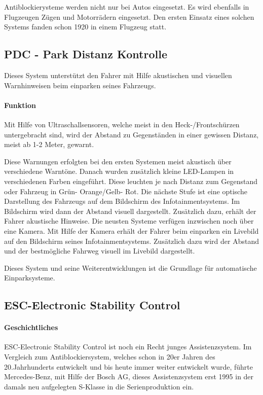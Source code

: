 Antiblockierysteme werden nicht nur bei Autos eingesetzt. Es wird ebenfalls in Flugzeugen Zügen und Motorrädern eingesetzt. 
Den ersten Einsatz eines solchen Systems fanden schon 1920 in einem Flugzeug statt.

\subsection{PDC - Park Distanz Kontrolle}
Dieses System unterstützt den Fahrer mit Hilfe akustischen und visuellen Warnhinweisen beim einparken seines Fahrzeugs. 
\paragraph{Funktion}Mit Hilfe von Ultraschallsensoren, welche meist in den Heck-/Frontschürzen untergebracht sind, wird der Abstand zu Gegenständen in einer gewissen Distanz, meist ab 1-2 Meter, gewarnt. 

Diese Warnungen erfolgten bei den ersten Systemen meist akustisch über verschiedene Warntöne. Danach wurden zusätzlich kleine LED-Lampen in verschiedenen Farben eingeführt. Diese leuchten je nach Distanz zum Gegenstand oder Fahrzeug in Grün- Orange/Gelb- Rot. Die nächste Stufe ist eine optische Darstellung des Fahrzeugs auf dem Bildschirm des Infotainmentsystems. Im Bildschirm wird dann der Abstand visuell dargestellt. Zusätzlich dazu, erhält der Fahrer akustische Hinweise. Die neusten Systeme verfügen inzwischen noch über eine Kamera. Mit Hilfe der Kamera erhält der Fahrer beim einparken ein Livebild auf den Bildschirm seines Infotainmentsystems. Zusätzlich dazu wird der Abstand und der bestmögliche Fahrweg visuell im Livebild dargestellt.

Dieses System und seine Weiterentwicklungen ist die Grundlage für automatische Einparksysteme. 
\subsection{ESC-Electronic Stability Control} 
\paragraph{Geschichtliches} ESC-Electronic Stability Control ist noch ein Recht junges Assistenzsystem. Im Vergleich zum Antiblockiersystem, welches schon in 20er Jahren des 20.Jahrhunderts entwickelt und bis heute immer weiter entwickelt wurde, führte Mercedes-Benz, mit Hilfe der Bosch AG, dieses Assistenzsystem erst 1995 in der damals neu aufgelegten S-Klasse in die Serienproduktion ein. 

